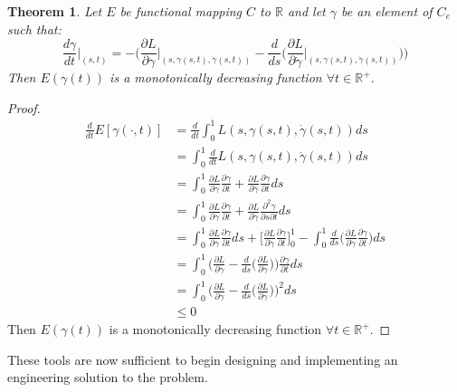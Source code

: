 \documentclass{article}
\newcommand{\R}{\mathds{R}}
\newtheorem{thm}{Theorem}
\begin{document}
					\begin{thm}\label{th:decentfunc}
						Let $E$ be functional mapping $C$ to $\R$ and let $\gamma$ be an element of $C_e$ such that:
						\begin{equation}\label{eq:decentsimp}
							\frac{d\gamma}{dt}\biggr\rvert_{(s,t)} = - \Bigg(\frac{\partial L}{\partial \gamma}\biggr\rvert_{(s,\gamma(s,t),\dot\gamma(s,t))} - \frac{d}{ds}\bigg(\frac{\partial L}{\partial \dot\gamma}\biggr\rvert_{(s,\gamma(s,t),\dot\gamma(s,t))}\bigg)\Bigg)
						\end{equation} 
						Then $E(\gamma(t))$ is a monotonically decreasing function $\forall t\in\R^+$.
					\end{thm}

					\begin{proof}
						\begin{align*}
							\frac{d}{dt}E[\gamma(\cdot,t)] &= \frac{d}{dt}\int_0^1{L(s,\gamma(s,t),\dot\gamma(s,t))ds}\\
							&= \int_0^1{\frac{d}{dt}L(s,\gamma(s,t),\dot\gamma(s,t))ds}\\
							&= \int_0^1{\frac{\partial L}{\partial \gamma}\frac{\partial\gamma}{\partial t} + \frac{\partial L}{\partial \dot\gamma}\frac{\partial\dot\gamma}{\partial t}ds}\\
							&= \int_0^1{\frac{\partial L}{\partial \gamma}\frac{\partial\gamma}{\partial t} + \frac{\partial L}{\partial \dot\gamma}\frac{\partial^2\gamma}{\partial s\partial t}ds}\\
							&= \int_0^1{\frac{\partial L}{\partial \gamma}\frac{\partial\gamma}{\partial t} ds} + \bigg[\frac{\partial L}{\partial \dot\gamma}\frac{\partial\gamma}{\partial t}\bigg]_0^1 -\int_0^1{\frac{d}{ds}\bigg(\frac{\partial L}{\partial \dot\gamma}\frac{\partial\gamma}{\partial t}\bigg)ds}\\
							&= \int_0^1{\Bigg(\frac{\partial L}{\partial \gamma} - \frac{d}{ds}\bigg(\frac{\partial L}{\partial \dot\gamma}\bigg)\Bigg)\frac{\partial\gamma}{\partial t}ds}\\
							&= \int_0^1{\Bigg(\frac{\partial L}{\partial \gamma} - \frac{d}{ds}\bigg(\frac{\partial L}{\partial \dot\gamma}\bigg)\Bigg)^2 ds}\\
							&\leq 0
						\end{align*}
						Then $E(\gamma(t))$ is a monotonically decreasing function $\forall t\in\R^+$.
					\end{proof}
					These tools are now sufficient to begin designing and implementing an engineering solution to the problem.
\end{document}

